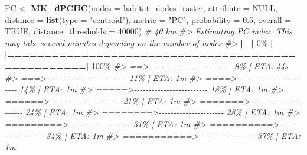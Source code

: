 \documentclass[
]{book}
\newenvironment{Shaded}{\begin{snugshade}}{\end{snugshade}}
\newcommand{\AttributeTok}[1]{\textcolor[rgb]{0.13,0.29,0.53}{#1}}
\newcommand{\CommentTok}[1]{\textcolor[rgb]{0.56,0.35,0.01}{\textit{#1}}}
\newcommand{\ConstantTok}[1]{\textcolor[rgb]{0.56,0.35,0.01}{#1}}
\newcommand{\DecValTok}[1]{\textcolor[rgb]{0.00,0.00,0.81}{#1}}
\newcommand{\ErrorTok}[1]{\textcolor[rgb]{0.64,0.00,0.00}{\textbf{#1}}}
\newcommand{\FloatTok}[1]{\textcolor[rgb]{0.00,0.00,0.81}{#1}}
\newcommand{\FunctionTok}[1]{\textcolor[rgb]{0.13,0.29,0.53}{\textbf{#1}}}
\newcommand{\NormalTok}[1]{#1}
\newcommand{\OtherTok}[1]{\textcolor[rgb]{0.56,0.35,0.01}{#1}}
\newcommand{\SpecialCharTok}[1]{\textcolor[rgb]{0.81,0.36,0.00}{\textbf{#1}}}
\newcommand{\StringTok}[1]{\textcolor[rgb]{0.31,0.60,0.02}{#1}}
\begin{document}
\begin{Shaded}
\begin{Highlighting}[]
\NormalTok{PC }\OtherTok{\textless{}{-}} \FunctionTok{MK\_dPCIIC}\NormalTok{(}\AttributeTok{nodes =}\NormalTok{ habitat\_nodes\_raster,}
                \AttributeTok{attribute =} \ConstantTok{NULL}\NormalTok{,}
                \AttributeTok{distance =} \FunctionTok{list}\NormalTok{(}\AttributeTok{type =} \StringTok{"centroid"}\NormalTok{),}
                \AttributeTok{metric =} \StringTok{"PC"}\NormalTok{, }\AttributeTok{probability =} \FloatTok{0.5}\NormalTok{,}
                \AttributeTok{overall =} \ConstantTok{TRUE}\NormalTok{,}
                \AttributeTok{distance\_thresholds =} \DecValTok{40000}\NormalTok{) }\CommentTok{\# 40 km}
\CommentTok{\#\textgreater{} Estimating PC index. This may take several minutes depending on the number of nodes}
\CommentTok{\#\textgreater{} }
  \SpecialCharTok{|}                                                        
  \ErrorTok{|}                                                  \ErrorTok{|}   \DecValTok{0}\NormalTok{\%}
  \SpecialCharTok{|}                                                        
  \ErrorTok{|==================================================|} \DecValTok{100}\NormalTok{\%}
\CommentTok{\#\textgreater{}  ==\textgreater{}{-}{-}{-}{-}{-}{-}{-}{-}{-}{-}{-}{-}{-}{-}{-}{-}{-}{-}{-}{-}{-}{-}{-}{-}{-}{-}{-}{-}    8\% |  ETA: 44s}
\CommentTok{\#\textgreater{}  ===\textgreater{}{-}{-}{-}{-}{-}{-}{-}{-}{-}{-}{-}{-}{-}{-}{-}{-}{-}{-}{-}{-}{-}{-}{-}{-}{-}{-}{-}   11\% |  ETA:  1m}
\CommentTok{\#\textgreater{}  ====\textgreater{}{-}{-}{-}{-}{-}{-}{-}{-}{-}{-}{-}{-}{-}{-}{-}{-}{-}{-}{-}{-}{-}{-}{-}{-}{-}{-}   14\% |  ETA:  1m}
\CommentTok{\#\textgreater{}  =====\textgreater{}{-}{-}{-}{-}{-}{-}{-}{-}{-}{-}{-}{-}{-}{-}{-}{-}{-}{-}{-}{-}{-}{-}{-}{-}{-}   18\% |  ETA:  1m}
\CommentTok{\#\textgreater{}  ======\textgreater{}{-}{-}{-}{-}{-}{-}{-}{-}{-}{-}{-}{-}{-}{-}{-}{-}{-}{-}{-}{-}{-}{-}{-}{-}   21\% |  ETA:  1m}
\CommentTok{\#\textgreater{}  =======\textgreater{}{-}{-}{-}{-}{-}{-}{-}{-}{-}{-}{-}{-}{-}{-}{-}{-}{-}{-}{-}{-}{-}{-}{-}   24\% |  ETA:  1m}
\CommentTok{\#\textgreater{}  ========\textgreater{}{-}{-}{-}{-}{-}{-}{-}{-}{-}{-}{-}{-}{-}{-}{-}{-}{-}{-}{-}{-}{-}{-}   28\% |  ETA:  1m}
\CommentTok{\#\textgreater{}  =========\textgreater{}{-}{-}{-}{-}{-}{-}{-}{-}{-}{-}{-}{-}{-}{-}{-}{-}{-}{-}{-}{-}{-}   31\% |  ETA:  1m}
\CommentTok{\#\textgreater{}  ==========\textgreater{}{-}{-}{-}{-}{-}{-}{-}{-}{-}{-}{-}{-}{-}{-}{-}{-}{-}{-}{-}{-}   34\% |  ETA:  1m}
\CommentTok{\#\textgreater{}  ===========\textgreater{}{-}{-}{-}{-}{-}{-}{-}{-}{-}{-}{-}{-}{-}{-}{-}{-}{-}{-}{-}   37\% |  ETA:  1m}

\end{Highlighting}
\end{Shaded}
\end{document}
